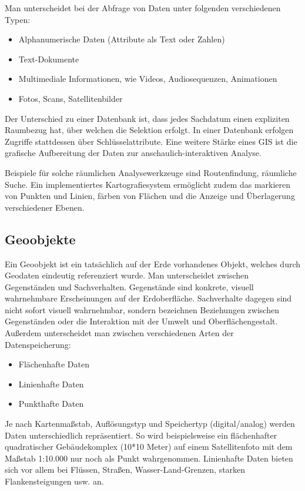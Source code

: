 \documentclass[11pt,ceqn]{book}
\begin{document}
Man unterscheidet bei der Abfrage von Daten unter folgenden verschiedenen Typen:
\begin{itemize}
\item Alphanumerische Daten (Attribute als Text oder Zahlen)
\item Text-Dokumente 
\item Multimediale Informationen, wie Videos, Audiosequenzen, Animationen 
\item Fotos, Scans, Satellitenbilder
\end{itemize}

Der Unterschied zu einer Datenbank ist, dass jedes Sachdatum einen expliziten Raumbezug hat, über welchen die Selektion erfolgt. In einer Datenbank erfolgen Zugriffe stattdessen über Schlüsselattribute. Eine weitere Stärke eines GIS ist die grafische Aufbereitung der Daten zur anschaulich-interaktiven Analyse.

Beispiele für solche räumlichen Analysewerkzeuge sind Routenfindung, räumliche Suche. Ein implementiertes Kartografiesystem ermöglicht zudem das markieren von Punkten und Linien, färben von Flächen und die Anzeige und Überlagerung verschiedener Ebenen.

\subsection{Geoobjekte}
Ein Geoobjekt ist ein tatsächlich auf der Erde vorhandenes Objekt, welches durch Geodaten eindeutig referenziert wurde. Man unterscheidet zwischen Gegenständen und Sachverhalten. Gegenstände sind konkrete, visuell wahrnehmbare Erscheinungen auf der Erdoberfläche. Sachverhalte dagegen sind nicht sofort visuell wahrnehmbar, sondern bezeichnen Beziehungen zwischen Gegenständen oder die Interaktion mit der Umwelt und Oberflächengestalt.
Außerdem unterscheidet man zwischen verschiedenen Arten der Datenspeicherung:
\begin{itemize}
\item Flächenhafte Daten
\item Linienhafte Daten
\item Punkthafte Daten
\end{itemize}
Je nach Kartenmaßstab, Auflösungstyp und Speichertyp (digital/analog) werden Daten unterschiedlich repräsentiert. So wird beispielsweise ein flächenhafter quadratischer Gebäudekomplex (10*10 Meter) auf einem Satellitenfoto mit dem Maßstab 1:10.000 nur noch als Punkt wahrgenommen. Linienhafte Daten bieten sich vor allem bei Flüssen, Straßen, Wasser-Land-Grenzen, starken Flankensteigungen usw. an.
\end{document}
